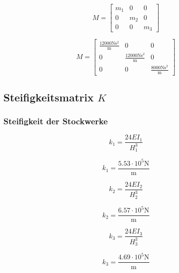 \documentclass[
  letterpaper,
  DIV=11]{scrreprt}
\begin{document}
\begin{equation}M = \left[\begin{matrix}m_{1} & 0 & 0\\0 & m_{2} & 0\\0 & 0 & m_{3}\end{matrix}\right]\end{equation}

\begin{equation}M = \left[\begin{matrix}\frac{12000 \text{N} \text{s}^{2}}{\text{m}} & 0 & 0\\0 & \frac{12000 \text{N} \text{s}^{2}}{\text{m}} & 0\\0 & 0 & \frac{8000 \text{N} \text{s}^{2}}{\text{m}}\end{matrix}\right]\end{equation}

\hypertarget{steifigkeitsmatrix-k}{%
\subsection{\texorpdfstring{Steifigkeitsmatrix
\(K\)}{Steifigkeitsmatrix K}}\label{steifigkeitsmatrix-k}}

\hypertarget{steifigkeit-der-stockwerke}{%
\subsubsection{Steifigkeit der
Stockwerke}\label{steifigkeit-der-stockwerke}}

\begin{equation}k_{1} = \frac{24 EI_{1}}{H_{1}^{3}}\end{equation}

\begin{equation}k_{1} = \frac{5.53 \cdot 10^{5} \text{N}}{\text{m}}\end{equation}

\begin{equation}k_{2} = \frac{24 EI_{2}}{H_{2}^{3}}\end{equation}

\begin{equation}k_{2} = \frac{6.57 \cdot 10^{5} \text{N}}{\text{m}}\end{equation}

\begin{equation}k_{3} = \frac{24 EI_{3}}{H_{3}^{3}}\end{equation}

\begin{equation}k_{3} = \frac{4.69 \cdot 10^{5} \text{N}}{\text{m}}\end{equation}
\end{document}
